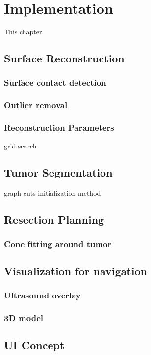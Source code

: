 \chapter{Implementation}
This chapter
\section{Surface Reconstruction}
\subsection{Surface contact detection}
\subsection{Outlier removal}
\subsection{Reconstruction Parameters}
grid search
\section{Tumor Segmentation}
graph cuts
initialization method
\section{Resection Planning}
\subsection{Cone fitting around tumor}
\section{Visualization for navigation}
\subsection{Ultrasound overlay}
\subsection{3D model}
\section{UI Concept}
